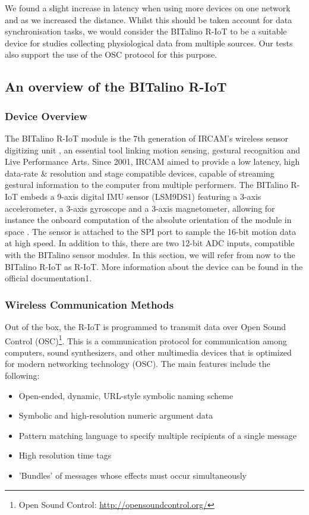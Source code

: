 We found a slight increase in latency when using more devices on one network and as we increased the distance. Whilst this should be taken account for data synchronisation tasks, we would consider the BITalino R-IoT to be a suitable device for studies collecting physiological data from multiple sources. Our tests also support the use of the OSC protocol for this purpose.

\subsection{An overview of the BITalino R-IoT}

\subsubsection{Device Overview}

The BITalino R-IoT module is the 7th generation of IRCAM's wireless sensor digitizing unit \cite{noauthor_bitalino_nodate}, an essential tool linking motion sensing, gestural recognition and Live Performance Arts. Since 2001, IRCAM aimed to provide a low latency, high data-rate \& resolution and stage compatible devices, capable of streaming gestural information to the computer from multiple performers. The BITalino R-IoT embeds a 9-axis digital IMU sensor (LSM9DS1) featuring a 3-axis accelerometer, a 3-axis gyroscope and a 3-axis magnetometer, allowing for instance the onboard computation of the absolute orientation of the module in space \cite{matzka_developing_2019}. The sensor is attached to the SPI port to sample the 16-bit motion data at high speed. In addition to this, there are two 12-bit ADC inputs, compatible with the BITalino sensor modules. In this section, we will refer from now to the BITalino R-IoT as R-IoT. More information about the device can be found in the official documentation1.

\subsubsection{Wireless Communication Methods}
Out of the box, the R-IoT is programmed to transmit data over Open Sound Control (OSC)\footnote{Open Sound Control: \url{http://opensoundcontrol.org/}}. This is a communication protocol for communication among computers, sound synthesizers, and other multimedia devices that is optimized for modern networking technology (OSC). The main features include the following:

\begin{itemize}
  \item Open-ended, dynamic, URL-style symbolic naming scheme
  \item Symbolic and high-resolution numeric argument data
  \item Pattern matching language to specify multiple recipients of a single message
  \item High resolution time tags
  \item 'Bundles' of messages whose effects must occur simultaneously
\end{itemize}

